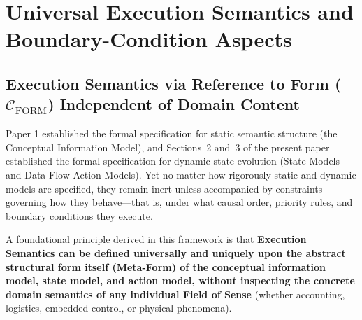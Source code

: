\documentclass[11pt,a4paper]{article}
\theoremstyle{definition}
\theoremstyle{plain}
\theoremstyle{remark}
\newcommand{\Cform}{\mathcal{C}_{\mathrm{FORM}}}
\begin{document}
\section{Universal Execution Semantics and Boundary-Condition Aspects}

\subsection{Execution Semantics via Reference to Form ($\Cform$) Independent of Domain Content}
Paper 1 established the formal specification for static semantic structure (the Conceptual Information Model), and Sections~2 and~3 of the present paper established the formal specification for dynamic state evolution (State Models and Data-Flow Action Models). Yet no matter how rigorously static and dynamic models are specified, they remain inert unless accompanied by constraints governing how they behave---that is, under what causal order, priority rules, and boundary conditions they execute.

A foundational principle derived in this framework is that \textbf{Execution Semantics can be defined universally and uniquely upon the abstract structural form itself (Meta-Form) of the conceptual information model, state model, and action model, without inspecting the concrete domain semantics of any individual Field of Sense} (whether accounting, logistics, embedded control, or physical phenomena).
\end{document}
